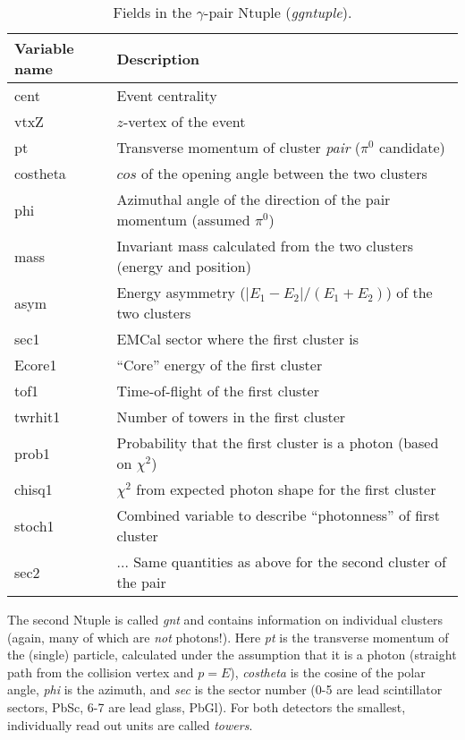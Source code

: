 \documentclass[pdftex,12pt,letter]{article}
\begin{document}
\begin{table}[h]
  \begin{tabular}{|l|l|} \hline
    Variable name & Description \\ \hline
    cent & Event centrality \\
    vtxZ & $z$-vertex of the event \\
    pt   & Transverse momentum of cluster {\it pair} ($\pi^0$
    candidate) \\
    costheta & $cos$ of the opening angle between the two clusters \\    
    phi & Azimuthal angle of the direction of the pair momentum
    (assumed $\pi^0$) \\
    mass & Invariant mass calculated from the two clusters (energy and
    position) \\
    asym & Energy asymmetry ($|E_1-E_2|/(E_1+E_2)$) of the two clusters \\
    sec1 & EMCal sector where the first cluster is \\
    Ecore1 & ``Core'' energy of the first cluster \\
    tof1   & Time-of-flight of the first cluster \\
    twrhit1 & Number of towers in the first cluster \\
    prob1 & Probability that the first cluster is a photon (based on
    $\chi^2$) \\
    chisq1 & $\chi^2$ from expected photon shape for the first cluster
    \\
    stoch1 & Combined variable to describe ``photonness'' of first
    cluster \\
    sec2 & ...  Same quantities as above for the second cluster of the
    pair \\ \hline
  \end{tabular}
  \vspace{0.3cm}
  \caption{Fields in the $\gamma$-pair Ntuple ({\it ggntuple}).
}
  \label{tab:ggntuple}
 \end{table}


The second Ntuple is called {\it gnt} and contains information on
individual clusters (again, many of which are {\it not} photons!).
Here {\it pt} is the transverse momentum of the (single) particle,
calculated under the assumption that it is a photon (straight path
from the collision vertex and $p=E$), {\it costheta} is the cosine of
the polar angle, {\it phi} is the azimuth, and {\it sec} is the sector
number (0-5 are lead scintillator sectors, PbSc, 6-7 are lead glass,
PbGl).  For both detectors the smallest, individually read out units
are called {\it towers}.
\end{document}
